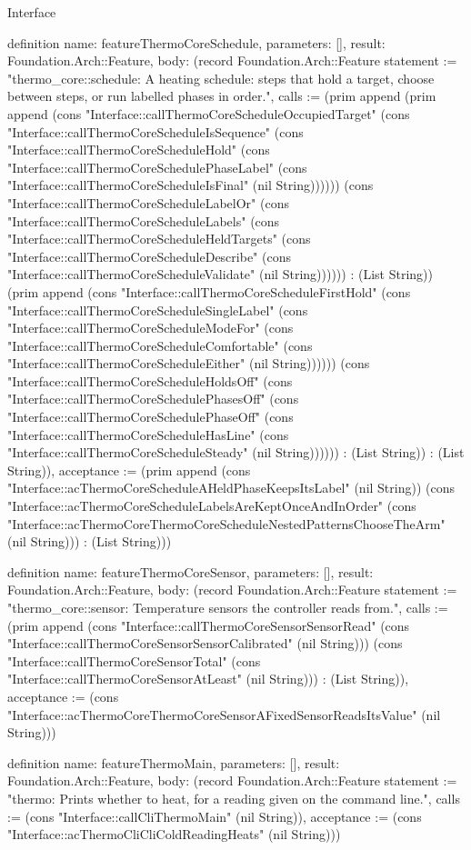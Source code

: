 \begin{lexlean}{Interface}
\begin{semanticmodule}
definition{
  name: featureThermoCoreSchedule,
  parameters: [],
  result: Foundation.Arch::Feature,
  body: (record Foundation.Arch::Feature {statement := "thermo_core::schedule: A heating schedule: steps that hold a target, choose between steps, or run labelled phases in order.", calls := (prim append (prim append (cons "Interface::callThermoCoreScheduleOccupiedTarget" (cons "Interface::callThermoCoreScheduleIsSequence" (cons "Interface::callThermoCoreScheduleHold" (cons "Interface::callThermoCoreSchedulePhaseLabel" (cons "Interface::callThermoCoreScheduleIsFinal" (nil String)))))) (cons "Interface::callThermoCoreScheduleLabelOr" (cons "Interface::callThermoCoreScheduleLabels" (cons "Interface::callThermoCoreScheduleHeldTargets" (cons "Interface::callThermoCoreScheduleDescribe" (cons "Interface::callThermoCoreScheduleValidate" (nil String)))))) : (List String)) (prim append (cons "Interface::callThermoCoreScheduleFirstHold" (cons "Interface::callThermoCoreScheduleSingleLabel" (cons "Interface::callThermoCoreScheduleModeFor" (cons "Interface::callThermoCoreScheduleComfortable" (cons "Interface::callThermoCoreScheduleEither" (nil String)))))) (cons "Interface::callThermoCoreScheduleHoldsOff" (cons "Interface::callThermoCoreSchedulePhasesOff" (cons "Interface::callThermoCoreSchedulePhaseOff" (cons "Interface::callThermoCoreScheduleHasLine" (cons "Interface::callThermoCoreScheduleSteady" (nil String)))))) : (List String)) : (List String)), acceptance := (prim append (cons "Interface::acThermoCoreScheduleAHeldPhaseKeepsItsLabel" (nil String)) (cons "Interface::acThermoCoreScheduleLabelsAreKeptOnceAndInOrder" (cons "Interface::acThermoCoreThermoCoreScheduleNestedPatternsChooseTheArm" (nil String))) : (List String))})
}

definition{
  name: featureThermoCoreSensor,
  parameters: [],
  result: Foundation.Arch::Feature,
  body: (record Foundation.Arch::Feature {statement := "thermo_core::sensor: Temperature sensors the controller reads from.", calls := (prim append (cons "Interface::callThermoCoreSensorSensorRead" (cons "Interface::callThermoCoreSensorSensorCalibrated" (nil String))) (cons "Interface::callThermoCoreSensorTotal" (cons "Interface::callThermoCoreSensorAtLeast" (nil String))) : (List String)), acceptance := (cons "Interface::acThermoCoreThermoCoreSensorAFixedSensorReadsItsValue" (nil String))})
}

definition{
  name: featureThermoMain,
  parameters: [],
  result: Foundation.Arch::Feature,
  body: (record Foundation.Arch::Feature {statement := "thermo: Prints whether to heat, for a reading given on the command line.", calls := (cons "Interface::callCliThermoMain" (nil String)), acceptance := (cons "Interface::acThermoCliCliColdReadingHeats" (nil String))})
}


\end{semanticmodule}
\end{lexlean}
